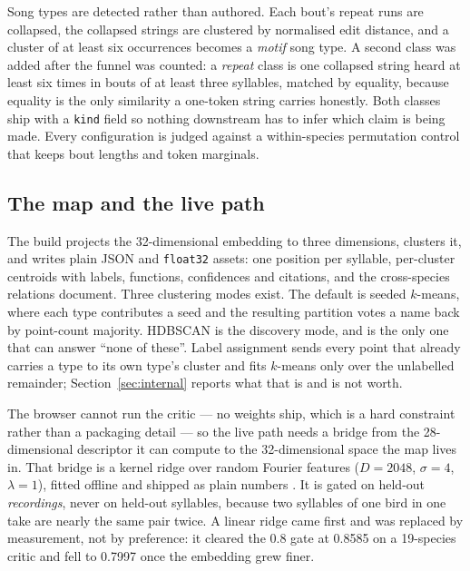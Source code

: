 \documentclass[10pt,twocolumn,a4paper]{article}
\begin{document}
Song types are detected rather than authored. Each bout's repeat runs are collapsed, the
collapsed strings are clustered by normalised edit distance, and a cluster of at least six
occurrences becomes a \emph{motif} song type. A second class was added after the funnel was
counted: a \emph{repeat} class is one collapsed string heard at least six times in bouts of
at least three syllables, matched by equality, because equality is the only similarity a
one-token string carries honestly. Both classes ship with a \texttt{kind} field so nothing
downstream has to infer which claim is being made. Every configuration is judged against a
within-species permutation control that keeps bout lengths and token marginals.

\subsection{The map and the live path}

The build projects the 32-dimensional embedding to three dimensions, clusters it, and
writes plain JSON and \texttt{float32} assets: one position per syllable, per-cluster
centroids with labels, functions, confidences and citations, and the cross-species
relations document. Three clustering modes exist. The default is seeded $k$-means, where
each type contributes a seed and the resulting partition votes a name back by point-count
majority. HDBSCAN is the discovery mode, and is the only one that can answer ``none of
these''. Label assignment sends every point that already carries a type to its own type's
cluster and fits $k$-means only over the unlabelled remainder; Section~\ref{sec:internal}
reports what that is and is not worth.

The browser cannot run the critic --- no weights ship, which is a hard constraint rather
than a packaging detail --- so the live path needs a bridge from the 28-dimensional
descriptor it can compute to the 32-dimensional space the map lives in. That bridge is a
kernel ridge over random Fourier features ($D = 2048$, $\sigma = 4$, $\lambda = 1$),
fitted offline and shipped as plain numbers \citep{rff2007}. It is gated on held-out
\emph{recordings}, never on held-out syllables, because two syllables of one bird in one
take are nearly the same pair twice. A linear ridge came first and was replaced by
measurement, not by preference: it cleared the 0.8 gate at 0.8585 on a 19-species critic
and fell to 0.7997 once the embedding grew finer.
\end{document}
